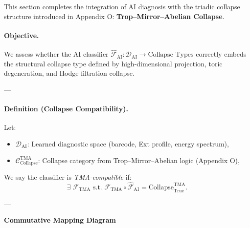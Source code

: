 \documentclass[11pt]{article}
\begin{document}
\begin{axiom}
\begin{axiom}
{{This section completes the integration of AI diagnosis with the triadic collapse structure introduced in Appendix O:  
\textbf{Trop–Mirror–Abelian Collapse}.

\paragraph{Objective.}  
We assess whether the AI classifier \( \widehat{\mathcal{F}}_{\text{AI}}: \mathcal{D}_{\text{AI}} \to \text{Collapse Types} \)  
correctly embeds the structural collapse type defined by high-dimensional projection, toric degeneration, and Hodge filtration collapse.

---

\paragraph{Definition (Collapse Compatibility).}

Let:
\begin{itemize}
  \item \( \mathcal{D}_{\text{AI}} \): Learned diagnostic space (barcode, Ext profile, energy spectrum),
  \item \( \mathcal{C}^{\mathrm{TMA}}_{\text{Collapse}} \): Collapse category from Trop–Mirror–Abelian logic (Appendix O),
\end{itemize}

We say the classifier is \emph{TMA-compatible} if:
\[
\exists \; \mathcal{F}_{\mathrm{TMA}} \text{ s.t. } \mathcal{F}_{\mathrm{TMA}} \circ \widehat{\mathcal{F}}_{\text{AI}} = \text{Collapse}^{\mathrm{TMA}}_{\text{True}}.
\]

---

\vspace{1.5em}
\noindent\textbf{Commutative Mapping Diagram}

\vspace{0.5em}
\noindent
\begin{minipage}{\textwidth}
\centering
{}
\vspace{0.5em}


\end{minipage}}}
\end{axiom}
\end{axiom}
\end{document}
